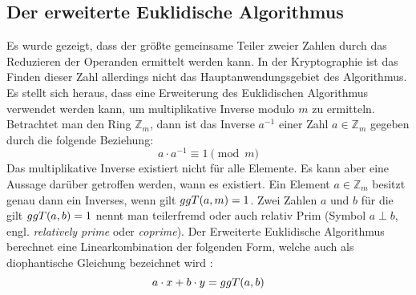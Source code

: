 \subsection{Der erweiterte Euklidische Algorithmus}
Es wurde gezeigt, dass der größte gemeinsame Teiler zweier Zahlen durch
das Reduzieren der Operanden ermittelt werden kann. In der Kryptographie ist
das Finden dieser Zahl allerdings nicht das Hauptanwendungsgebiet des
Algorithmus. Es stellt sich heraus, dass eine Erweiterung des Euklidischen Algorithmus
verwendet werden kann, um multiplikative Inverse modulo $m$ zu ermitteln.
Betrachtet man den Ring $\mathbb{Z}_m$, dann ist das Inverse $a^{-1}$
einer Zahl $a \in \mathbb{Z}_m$ gegeben durch die folgende Beziehung:
\begin{equation}
  \label{eq:inverse}
  a \cdot a^{-1} \equiv 1 \pmod{m}
\end{equation}
Das multiplikative Inverse existiert nicht für alle Elemente. Es kann aber eine Aussage
darüber getroffen werden, wann es existiert. Ein Element
$a \in \mathbb{Z}_m$ besitzt genau dann ein Inverses, wenn gilt $ggT(a,m) = 1$.
Zwei Zahlen $a$ und $b$ für die gilt $ggT(a,b) = 1$ nennt man teilerfremd oder auch
relativ Prim (Symbol $a \perp b$, engl. \textit{relatively prime} oder \textit{coprime}).
Der Erweiterte Euklidische Algorithmus berechnet eine Linearkombination der folgenden Form,
welche auch als diophantische Gleichung
bezeichnet wird \parencite[160]{BOOK:crypto} \parencite{SITE:diophant}:
\begin{equation*}
  a \cdot x + b \cdot y = ggT(a,b)
\end{equation*}

